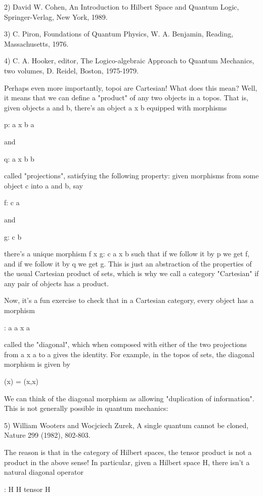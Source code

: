 2) David W. Cohen, An Introduction to Hilbert Space and Quantum
Logic, Springer-Verlag, New York, 1989.

3) C. Piron, Foundations of Quantum Physics, W. A. Benjamin, 
Reading, Massachusetts, 1976.

4) C. A. Hooker, editor, The Logico-algebraic Approach to Quantum 
Mechanics, two volumes, D. Reidel, Boston, 1975-1979.  

Perhaps even more importantly, topoi are Cartesian!  What does this
mean?  Well, it means that we can define a "product" of any two 
objects in a topos.  That is, given objects a and b, there's an 
object a x b equipped with morphisms

p: a x b \to  a

and 

q: a x b \to  b

called "projections", satisfying the following property: given 
morphisms from some object c into a and b, say

f: c \to  a

and

g: c \to  b

there's a unique morphism f x g: c \to   a x b such that if we 
follow it by p we get f, and if we follow it by q we get g.  This
is just an abstraction of the properties of the usual Cartesian
product of sets, which is why we call a category "Cartesian" if
any pair of objects has a product.  

Now, it's a fun exercise to check that in a Cartesian
category, every object has a morphism 

\Delta : a \to  a x a

called the "diagonal", which when composed with either of the two 
projections from a x a to a gives the identity.  For example, in 
the topos of sets, the diagonal morphism is given by

\Delta (x) = (x,x)

We can think of the diagonal morphism as allowing "duplication 
of information".   This is not generally possible in quantum 
mechanics:

5) William Wooters and Wocjciech Zurek, A single quantum cannot
be cloned, Nature 299 (1982), 802-803.

The reason is that in the category of Hilbert spaces, the
tensor product is not a product in the above sense!  In 
particular, given a Hilbert space H, there isn't a natural 
diagonal operator 

\Delta : H \to  H tensor H 

